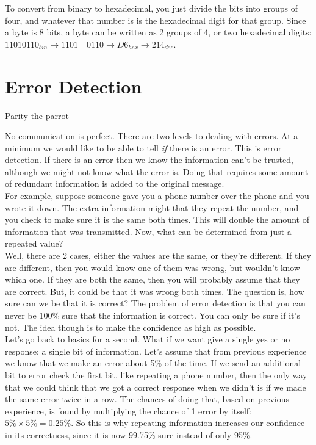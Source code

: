 To convert from binary to hexadecimal, you just divide the bits into groups of four, and whatever that number is is the hexadecimal digit for that group. Since a byte is 8 bits, a byte can be written as 2 groups of 4, or two hexadecimal digits: \(11010110_{bin} \rightarrow 1101\quad0110 \rightarrow D6_{hex} \rightarrow 214_{dec}\).

\section{Error Detection}

\epigraph{}{Parity the parrot}

No communication is perfect. There are two levels to dealing with errors. At a minimum we would like to be able to tell \textit{if} there is an error. This is error detection. If there is an error then we know the information can't be trusted, although we might not know what the error is. Doing that requires some amount of redundant information is added to the original message.\\

For example, suppose someone gave you a phone number over the phone and you wrote it down. The extra information might that they repeat the number, and you check to make sure it is the same both times. This will double the amount of information that was transmitted. Now, what can be determined from just a repeated value?\\

Well, there are 2 cases, either the values are the same, or they're different. If they are different, then you would know one of them was wrong, but wouldn't know which one. If they are both the same, then you will probably assume that they are correct. But, it could be that it was wrong both times. The question is, how sure can we be that it is correct? The problem of error detection is that you can never be 100\% sure that the information is correct. You can only be sure if it's not. The idea though is to make the confidence as high as possible.\\

Let's go back to basics for a second. What if we want give a single yes or no response: a single bit of information. Let's assume that from previous experience we know that we make an error about 5\% of the time. If we send an additional bit to error check the first bit, like repeating a phone number, then the only way that we could think that we got a correct response when we didn't is if we made the same error twice in a row. The chances of doing that, based on previous experience, is found by multiplying the chance of 1 error by itself: \(5\% \times 5\% = 0.25\%\). So this is why repeating information increases our confidence in its correctness, since it is now 99.75\% sure instead of only 95\%.\\

